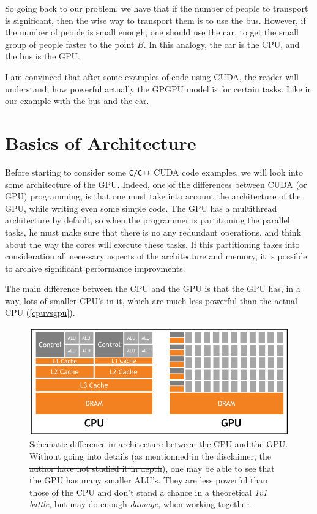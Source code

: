 \documentclass[12pt]{article}
\begin{document}
So going back to our problem, we have that if the number of people to transport is significant, 
then the wise way to transport them is to use the bus. However, if the number of people is small enough, 
one should use the car, to get the small group of people faster to the point $B$. 
In this analogy, the car is the CPU, and the bus is the GPU.

I am convinced that after some examples of code using CUDA, the reader will understand, how powerful
actually the GPGPU model is for certain tasks. Like in our example with the bus and the car.

\section{Basics of Architecture}

Before starting to consider some \verb|C/C++| CUDA code examples, we will look into some architecture of the GPU. 
Indeed, one of the differences between CUDA (or GPU) programming, is that one must take into account
the architecture of the GPU, while writing even some simple code. The GPU has a multithread architecture by default, 
so when the programmer is partitioning the parallel tasks, he must make sure that there is no any redundant
operations, and think about the way the cores will execute these tasks. If this partitioning takes into consideration all necessary aspects of the architecture and memory, it is possible to archive significant performance improvments.


The main difference between the CPU and the GPU is that the GPU has, in a way, lots of smaller CPU's in it, which 
are much less powerful than the actual CPU (\autoref{cpuvsgpu}).
\cite{tuomanen2018hands}

\begin{figure}
   \centering
   \includegraphics[scale=0.4]{cpuvsgpu.png}
   \caption{Schematic difference in architecture between the CPU and the GPU. Without going into details 
   (\sout{as mentionned in the disclaimer, the author have not studied it in depth}), one may be able to see that 
   the GPU has many smaller ALU's. They are less powerful than those of the CPU and don't stand a chance in 
    a theoretical \textit{1v1 battle}, but may do enough \textit{damage}, when working together.}
   \label{cpuvsgpu}
\end{figure}
\end{document}
